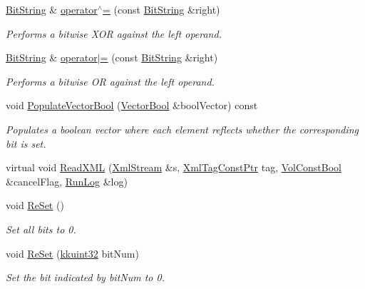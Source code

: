 \begin{DoxyCompactItemize}
\hyperlink{class_k_k_b_1_1_bit_string}{Bit\+String} \& \hyperlink{class_k_k_b_1_1_bit_string_ab2806a5d5386ff44ead5463528aff5ff}{operator$^\wedge$=} (const \hyperlink{class_k_k_b_1_1_bit_string}{Bit\+String} \&right)
\begin{DoxyCompactList}\small\item\em Performs a bitwise X\+OR against the left operand. \end{DoxyCompactList}\item 
\hyperlink{class_k_k_b_1_1_bit_string}{Bit\+String} \& \hyperlink{class_k_k_b_1_1_bit_string_a596dbd93da7626d59ca53ea5ca5bbd7d}{operator$\vert$=} (const \hyperlink{class_k_k_b_1_1_bit_string}{Bit\+String} \&right)
\begin{DoxyCompactList}\small\item\em Performs a bitwise OR against the left operand. \end{DoxyCompactList}\item 
void \hyperlink{class_k_k_b_1_1_bit_string_a39ddda1f72f0f2106cb6352efdcca3be}{Populate\+Vector\+Bool} (\hyperlink{namespace_k_k_b_a14c7fc0d2e2c8b80878017f195980b89}{Vector\+Bool} \&bool\+Vector) const 
\begin{DoxyCompactList}\small\item\em Populates a boolean vector where each element reflects whether the corresponding bit is set. \end{DoxyCompactList}\item 
virtual void \hyperlink{class_k_k_b_1_1_bit_string_a63fa7f49ff50431c75443fe287fe5d4f}{Read\+X\+ML} (\hyperlink{class_k_k_b_1_1_xml_stream}{Xml\+Stream} \&s, \hyperlink{namespace_k_k_b_a5f1b0b1667d79fec26deeff10c43df23}{Xml\+Tag\+Const\+Ptr} tag, \hyperlink{namespace_k_k_b_a7d390f568e2831fb76b86b56c87bf92f}{Vol\+Const\+Bool} \&cancel\+Flag, \hyperlink{class_k_k_b_1_1_run_log}{Run\+Log} \&log)
\item 
void \hyperlink{class_k_k_b_1_1_bit_string_a3a1d4d31e09c629708e1fab7b61d5827}{Re\+Set} ()
\begin{DoxyCompactList}\small\item\em Set all bits to \textquotesingle{}0\textquotesingle{}. \end{DoxyCompactList}\item 
void \hyperlink{class_k_k_b_1_1_bit_string_ae227683a35784b738e238fcba450e2b3}{Re\+Set} (\hyperlink{namespace_k_k_b_af8d832f05c54994a1cce25bd5743e19a}{kkuint32} bit\+Num)
\begin{DoxyCompactList}\small\item\em Set the bit indicated by \textquotesingle{}bit\+Num\textquotesingle{} to \textquotesingle{}0\textquotesingle{}. \end{DoxyCompactList}\item 

\end{DoxyCompactItemize}
